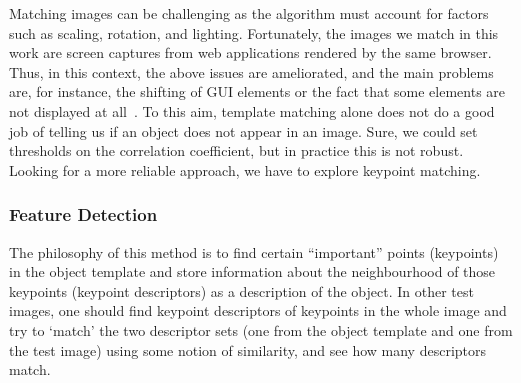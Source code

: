 Matching images can be challenging as the algorithm must account for factors such as scaling, rotation, and lighting. Fortunately, the images we match in this work are screen captures from web applications rendered by the same browser. Thus, in this context, the above issues are ameliorated, and the main problems are, for instance, the shifting of GUI elements or the fact that some elements are not displayed at all~\cite{}.
% 
To this aim, template matching alone does not do a good job of telling us if an object does not appear in an image. Sure, we could set thresholds on the correlation coefficient, but in practice this is not robust. Looking for a more reliable approach, we have to explore keypoint matching.

\subsubsection{Feature Detection}

The philosophy of this method is to find certain ``important'' points (keypoints) in the object template and store information about the neighbourhood of those keypoints (keypoint descriptors) as a description of the object. In other test images, one should find keypoint descriptors of keypoints in the whole image and try to `match' the two descriptor sets (one from the object template and one from the test image) using some notion of similarity, and see how many descriptors match.




